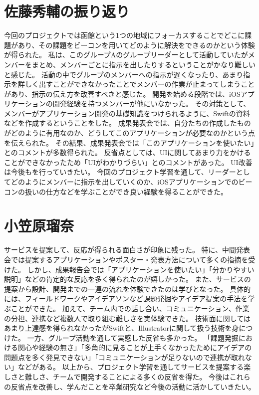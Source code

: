 \documentclass[openany,11pt,papersize]{jsbook}
\begin{document}
\section{佐藤秀輔の振り返り}
今回のプロジェクトでは函館という1つの地域にフォーカスすることでどこに課題があり、その課題をビーコンを用いてどのように解決をできるのかという体験が得られた。
私は、このグループAのグループリーダーとして活動していたがメンバーをまとめ、メンバーごとに指示を出したりするということがかなり難しいと感じた。
活動の中でグループのメンバーへの指示が遅くなったり、あまり指示を詳しく出すことができなかったことでメンバーの作業が止まってしまうことがあり、指示の伝え方を改善すべきと感じた。
開発を始める段階では、iOSアプリケーションの開発経験を持つメンバーが他にいなかった。
その対策として、メンバーがアプリケーション開発の基礎知識をつけられるように、Swiftの資料などを作成するということをした。
成果発表会では、自分たちの作成したものがどのように有用なのか、どうしてこのアプリケーションが必要なのかという点を伝えられた。
その結果、成果発表会では「このアプリケーションを使いたい」とのコメントが多数得られた。
反省点としては、UIに関してあまり力をかけることができなかったため「UIがわかりづらい」とのコメントがあった。
UI改善は今後もを行っていきたい。
今回のプロジェクト学習を通して、リーダーとしてどのようにメンバーに指示を出していくのか、iOSアプリケーションでのビーコンの扱いの仕方などを学ぶことができ良い経験を得ることができた。


\section{小笠原瑠奈}
サービスを提案して、反応が得られる面白さが印象に残った。
特に、中間発表会では提案するアプリケーションやポスター・発表方法について多くの指摘を受けた。
しかし、成果報告会では「アプリケーションを使いたい」「分かりやすい説明」などの肯定的な反応を多く得られたのが嬉しかった。
また、サービスの提案から設計、開発までの一連の流れを体験できたのは学びとなった。
具体的には、フィールドワークやアイデアソンなど課題発掘やアイデア提案の手法を学ぶことができた。
加えて、チーム内での話し合い、コミュニケーション、作業の分担、連携など複数人で取り組む難しさを実体験できた。
技術面に関してはあまり上達感を得られなかったがSwiftと、Illustratorに関して扱う技術を身につけた。
一方、グループ活動を通して実感した反省も多かった。
「課題発掘における関心や経験の無さ」「多角的に見ることが上手くなかったためにアイデアの問題点を多く発見できない」「コミュニケーションが足りないので連携が取れない」などがある。
以上から、プロジェクト学習を通してサービスを提案する楽しさと難しさ、チームで開発することによる多くの反省を得た。
今後はこれらの反省点を改善し、学んだことを卒業研究など今後の活動に活かしていきたい。
\end{document}
